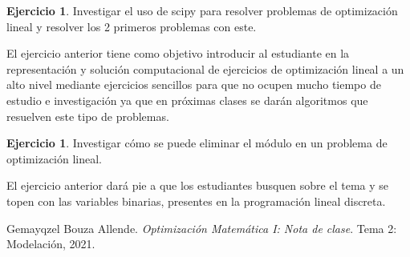 \documentclass[a4paper,10pt,twocolumn]{article}
\theoremstyle{theorem}
\theoremstyle{definition}
\newtheorem{ejer}[thm]{Ejercicio}
\theoremstyle{remark}
\begin{document}
%
%
%
\begin{ejer}
	Investigar el uso de scipy para resolver problemas de optimización lineal y resolver los 2 primeros problemas con este.
\end{ejer}
El ejercicio anterior tiene como objetivo introducir al estudiante en la representación y solución computacional de ejercicios de optimización lineal a un alto nivel mediante ejercicios sencillos para que no ocupen mucho tiempo de estudio e investigación ya que en próximas clases se darán algoritmos que resuelven este tipo de problemas.

\begin{ejer}
	Investigar cómo se puede eliminar el módulo en un problema de optimización lineal. 
\end{ejer}
El ejercicio anterior dará pie a que los estudiantes busquen sobre el tema y se topen con las variables binarias, presentes en la programación lineal discreta.



\begin{thebibliography}{99}
	
	 Gemayqzel Bouza Allende. \emph{Optimización Matemática I: Nota de clase}.
		Tema 2: Modelación, 2021.

\end{thebibliography}

\label{end}
\end{document}
